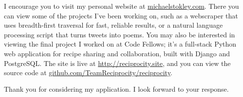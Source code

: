 \documentclass[10pt,a4paper,sans]{moderncv}        %
\begin{document}
I encourage you to visit my personal website at
{\href{http://michaelstokley.com}{michaelstokley.com}}. There you can view some
of the projects I've been working on, such as a webscraper that uses
breadth-first traversal for fast, reliable results, or a natural language
processing script that turns tweets into poems. You may also be interested in
viewing the final project I worked on at Code Fellows; it's a full-stack Python
web application for recipe sharing and collaboration, built with Django and
PostgreSQL. The site is live at
{\href{http://reciprocity.site.}{http://reciprocity.site}}, and you can view the
source code at
{\href{http://github.com/TeamReciprocity/reciprocity}{github.com/TeamReciprocity/reciprocity}}.

Thank you for considering my application. I look forward to your response.

\makeletterclosing
\end{document}
